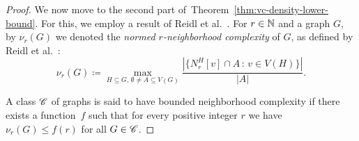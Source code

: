 \begin{proof}
\medskip
We now move to the  second part of~Theorem~\ref{thm:vc-density-lower-bound}. For this, we employ a result of Reidl et al.~\cite{reidl2016characterising}. 
%
%
%
%
%
For $r\in \mathbb{N}$ and a graph $G$, by $\nu_r(G)$ we denoted the
\emph{normed $r$-neighborhood complexity} of $G$, as defined
by Reidl et al.~\cite{reidl2016characterising}: 
\begin{equation*}
\nu_r(G)\coloneqq\max_{H\subseteq G,\,\emptyset\neq A\subseteq V(G)}\frac{|\{N_r^H[v]\cap A\, \colon\, v\in V(H)\}|}{|A|}.
\end{equation*}

A class $\mathscr{C}$ of graphs is said to have bounded neighborhood 
complexity if there exists a function~$f$ such that
for every positive integer $r$ we have $\nu_r(G)\leq f(r)$
for all $G\in\mathscr{C}$. 




\end{proof}
